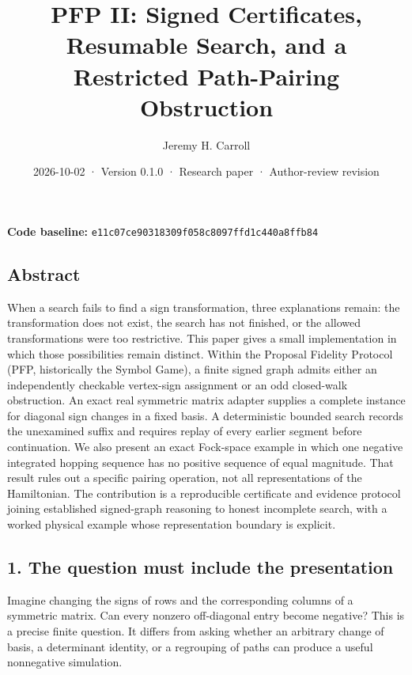 \documentclass[
  11pt,
]{article}
\title{PFP II: Signed Certificates, Resumable Search, and a Restricted
Path-Pairing Obstruction}
\author{Jeremy H. Carroll}
\date{2026-10-02 · Version 0.1.0 · Research paper · Author-review
revision}
\begin{document}
\makeatletter
\begin{center}
{\LARGE \@title\par}
\vspace{0.8em}
{\normalsize \@author\par}
\vspace{0.5em}
{\small \@date\par}
\end{center}
\makeatother

\textbf{Code baseline:}
\nolinkurl{e11c07ce90318309f058c8097ffd1c440a8ffb84}

\hypertarget{abstract}{%
\subsection{Abstract}\label{abstract}}

When a search fails to find a sign transformation, three explanations
remain: the transformation does not exist, the search has not finished,
or the allowed transformations were too restrictive. This paper gives a
small implementation in which those possibilities remain distinct.
Within the Proposal Fidelity Protocol (PFP, historically the Symbol
Game), a finite signed graph admits either an independently checkable
vertex-sign assignment or an odd closed-walk obstruction. An exact real
symmetric matrix adapter supplies a complete instance for diagonal sign
changes in a fixed basis. A deterministic bounded search records the
unexamined suffix and requires replay of every earlier segment before
continuation. We also present an exact Fock-space example in which one
negative integrated hopping sequence has no positive sequence of equal
magnitude. That result rules out a specific pairing operation, not all
representations of the Hamiltonian. The contribution is a reproducible
certificate and evidence protocol joining established signed-graph
reasoning to honest incomplete search, with a worked physical example
whose representation boundary is explicit.

\hypertarget{the-question-must-include-the-presentation}{%
\subsection{1. The question must include the
presentation}\label{the-question-must-include-the-presentation}}

Imagine changing the signs of rows and the corresponding columns of a
symmetric matrix. Can every nonzero off-diagonal entry become negative?
This is a precise finite question. It differs from asking whether an
arbitrary change of basis, a determinant identity, or a regrouping of
paths can produce a useful nonnegative simulation.
\end{document}

